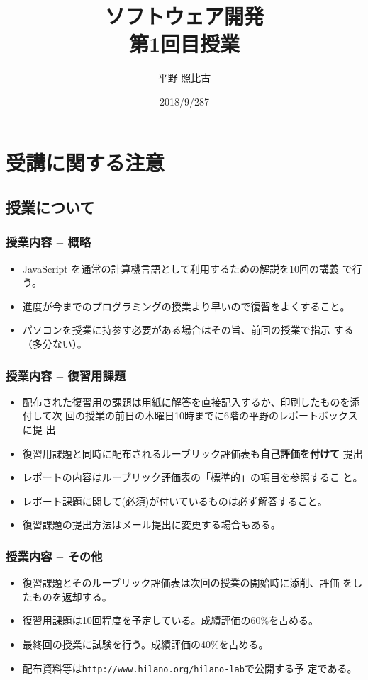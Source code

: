 
\title{ソフトウェア開発\\第1回目授業}
\author{平野 照比古}
\institute{}
\date{2018/9/287}

\frame{\maketitle}
\section{受講に関する注意}
\subsection{授業について}
\begin{frame}
 \frametitle{授業内容 -- 概略}
\begin{itemize}
 \item JavaScript を通常の計算機言語として利用するための解説を10回の講義
       で行う。
 \item 進度が今までのプログラミングの授業より早いので復習をよくすること。
 \item パソコンを授業に持参す必要がある場合はその旨、前回の授業で指示
       する（多分ない）。
\end{itemize}
\end{frame}
\begin{frame}
 \frametitle{授業内容 -- 復習用課題}
\begin{itemize}
   \item 配布された復習用の課題は用紙に解答を直接記入するか、印刷したものを添付して次
        回の授業の前日の木曜日10時までに6階の平野のレポートボックスに提
        出
 \item 復習用課題と同時に配布されるルーブリック評価表も{\bfseries 自己評価を付けて}
       提出
 \item レポートの内容はルーブリック評価表の「標準的」の項目を参照するこ
       と。
 \item レポート課題に関して(必須)が付いているものは必ず解答すること。
 \item 復習課題の提出方法はメール提出に変更する場合もある。
\end{itemize}
\end{frame}
\begin{frame}[containsverbatim]
 \frametitle{授業内容 -- その他}
\begin{itemize}
 \item 復習課題とそのルーブリック評価表は次回の授業の開始時に添削、評価
       をしたものを返却する。
 \item 復習用課題は10回程度を予定している。成績評価の60\%を占める。
\item 最終回の授業に試験を行う。成績評価の40\%を占める。
 \item 配布資料等は\texttt{http://www.hilano.org/hilano-lab}で公開する予
       定である。
\end{itemize}
\end{frame}
